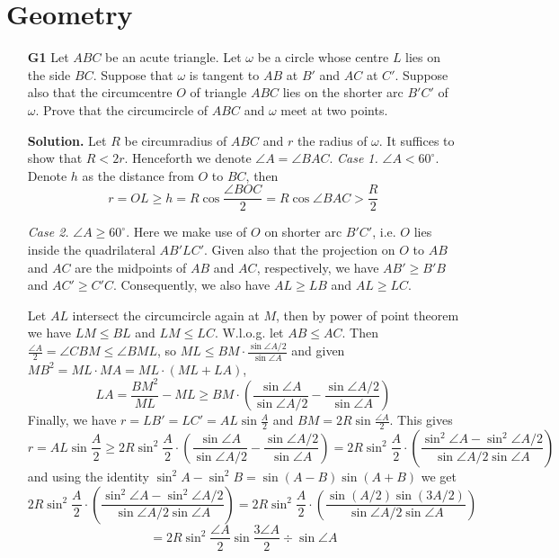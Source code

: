 \documentclass[11pt,a4paper]{article}
\begin{document}
\section*{Geometry}
\begin{enumerate}
	\item[\textbf{G1}]
	Let $ABC$ be an acute triangle. Let $\omega$ be a circle whose centre $L$ lies on the side $BC$. Suppose that $\omega$ is tangent to $AB$ at $B'$ and $AC$ at $C'$. Suppose also that the circumcentre $O$ of triangle $ABC$ lies on the shorter arc $B'C'$ of $\omega$. Prove that the circumcircle of $ABC$ and $\omega$ meet at two points.
	
	\textbf{Solution.} 
	Let $R$ be circumradius of $ABC$ and $r$ the radius of $\omega$. It suffices to show that $R<2r$. 
	Henceforth we denote $\angle A = \angle BAC$. 
	\emph{Case 1.} 
	$\angle A < 60^{\circ}$. 
	Denote $h$ as the distance from $O$ to $BC$, then 
	\[
	r = OL \ge h = R\cos\frac{\angle BOC}{2} = R\cos\angle BAC > \frac{R}{2}
	\]
	
	\emph{Case 2.} 
	$\angle A \ge 60^{\circ}$. 
	Here we make use of $O$ on shorter arc $B'C'$, i.e. $O$ lies inside the quadrilateral $AB'LC'$. 
	Given also that the projection on $O$ to $AB$ and $AC$ are the midpoints of $AB$ and $AC$, respectively, 
	we have $AB'\ge B'B$ and $AC'\ge C'C$. 
	Consequently, we also have $AL\ge LB$ and $AL\ge LC$. 
	
	Let $AL$ intersect the circumcircle again at $M$, 
	then by power of point theorem we have $LM\le BL$ and $LM\le LC$. 
	W.l.o.g. let $AB\le AC$. 
	Then $\frac{\angle A}{2}=\angle CBM\le \angle BML$, 
	so $ML\le BM\cdot \frac{\sin \angle A/2}{\sin\angle A}$
	and given $MB^2 = ML\cdot MA=ML\cdot (ML+LA)$, 
	\[
	LA =\frac{BM^2}{ML}-ML \ge BM\cdot (\frac{\sin\angle A}{\sin \angle A/2} - \frac{\sin \angle A/2}{\sin\angle A})
	\]
	Finally, we have $r =LB'=LC'= AL\sin\frac{A}{2}$ and $BM=2R\sin \frac{\angle A}{2}$. 
	This gives 
	\[
	r = AL\sin\frac{A}{2}
	\ge 2R\sin^2\frac{A}{2}\cdot (\frac{\sin\angle A}{\sin \angle A/2} - \frac{\sin \angle A/2}{\sin\angle A})
	= 
	2R\sin^2\frac{A}{2}\cdot (\frac{\sin^2\angle A - \sin^2\angle A/2}{\sin \angle A/2\sin\angle A})
	\]
	and using the identity 
	$\sin^2 A - \sin^2 B = \sin(A-B)\sin(A+B)$
	 we get 
	\[
	2R\sin^2\frac{A}{2}\cdot (\frac{\sin^2\angle A - \sin^2\angle A/2}{\sin \angle A/2\sin\angle A})
	= 2R\sin^2\frac{A}{2}\cdot (\frac{\sin(A/2)\sin (3A/2)}{\sin \angle A/2\sin\angle A})
	\]
	\[
	=2R\sin^2 \frac{\angle A}{2}\sin\frac{3\angle A}{2}\div \sin\angle A
	\]
	

\end{enumerate}
\end{document}
